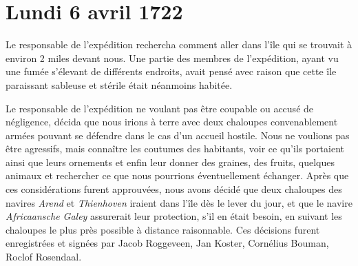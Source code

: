 \documentclass{article}
\begin{document}
            
        \section*{Lundi 6 avril 1722}
    
            
        
    Le responsable de l'expédition rechercha comment aller dans l'île qui se trouvait à environ 2 miles devant nous. Une partie des membres de l'expédition, ayant vu une fumée s'élevant de différents endroits, avait pensé avec raison que cette île paraissant sableuse et stérile était néanmoins habitée.
            
        
    Le responsable de l'expédition ne voulant pas être coupable ou accusé de négligence, décida que nous irions à terre avec deux chaloupes convenablement armées pouvant se défendre dans le cas d'un accueil hostile. Nous ne voulions pas être agressifs, mais connaître les coutumes des habitants, voir ce qu'ils portaient ainsi que leurs ornements et enfin leur donner des graines, des fruits, quelques animaux et rechercher ce que nous pourrions éventuellement échanger. Après que ces considérations furent approuvées, nous avons décidé que deux chaloupes des navires \textit{Arend} et \textit{Thienhoven} iraient dans l'île dès le lever du jour, et que le navire \textit{Africaansche Galey} assurerait leur protection, s'il en était besoin, en suivant les chaloupes le plus près possible à distance raisonnable. Ces décisions furent enregistrées et signées par Jacob Roggeveen, Jan Koster, Cornélius Bouman, Roclof Rosendaal.
            
\end{document}
